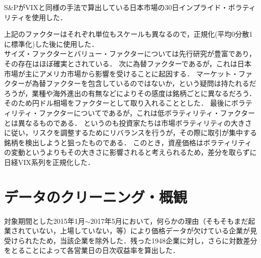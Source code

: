 \documentclass[11pt]{jreport}
\begin{document}
\begin{itemize}
\begin{itemize}
S\&PがVIXと同様の手法で算出している日本市場の30日インプライド・ボラティリティを使用した．
\end{itemize}
上記のファクターはそれぞれ単位もスケールも異なるので，正規化(平均0分散1に標準化)した後に使用した．\\
\quad 
サイズ・ファクターとバリュー・ファクターについては先行研究が豊富であり，その存在はほぼ確実とされている．
次に為替ファクターであるが，これは日本市場が主にアメリカ市場から影響を受けることに起因する．
マーケット・ファクターが為替ファクターを包含しているのではないか，という疑問は持たれるだろうが，業種や海外進出の有無などによりその感度は銘柄ごとに異なるだろう．
そのため円ドル相場をファクターとして取り入れることとした．
最後にボラティリティ・ファクターについてであるが，これは低ボラティリティ・ファクターとは異なるものである．
というのも投資家たちは市場ボラティリティの大きさに従い，リスクを調整するためにリバランスを行うが，その際に取引が集中する銘柄を検出しようと狙ったものである．
このとき，資産価格はボラティリティの変動というよりもその大きさに影響されると考えられるため，差分を取らずに日経VIX系列を正規化した．\\

\end{itemize}



\section{データのクリーニング・概観}
対象期間とした2015年1月$\sim$2017年5月において，何らかの理由（そもそもまだ起業されていない，上場していない，等）により価格データが欠けている企業が見受けられたため，当該企業を除外した．残った1948企業に対し，さらに対数差分をとることによって各営業日の日次収益率を算出した．
\end{document}
